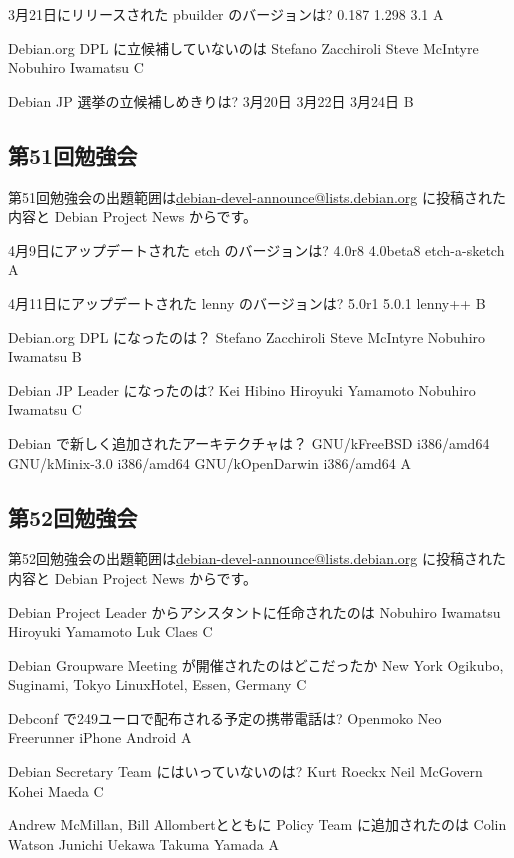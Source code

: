 \documentclass[mingoth,a4paper]{jsarticle}
\begin{document}
\begin{commandline}
 \santaku
 {3月21日にリリースされた pbuilder のバージョンは?}
 {0.187}
 {1.298}
 {3.1}
 {A}

 \santaku
 {Debian.org DPL に立候補していないのは}
 {Stefano Zacchiroli}
 {Steve McIntyre}
 {Nobuhiro Iwamatsu}
 {C}

 \santaku
 {Debian JP 選挙の立候補しめきりは?}
 {3月20日}
 {3月22日}
 {3月24日}
 {B}
 
 \subsection{第51回勉強会}
第51回勉強会の出題範囲は\url{debian-devel-announce@lists.debian.org} に投稿された内容と Debian Project News からです。

 \santaku
 {4月9日にアップデートされた etch のバージョンは?}
 {4.0r8}
 {4.0beta8}
 {etch-a-sketch}
 {A}

 \santaku
 {4月11日にアップデートされた lenny のバージョンは?}
 {5.0r1}
 {5.0.1}
 {lenny++}
 {B}

 \santaku
 {Debian.org DPL になったのは？}
 {Stefano Zacchiroli}
 {Steve McIntyre}
 {Nobuhiro Iwamatsu}
 {B}

 \santaku
 {Debian JP Leader になったのは?}
 {Kei Hibino}
 {Hiroyuki Yamamoto}
 {Nobuhiro Iwamatsu}
 {C}

 \santaku
 {Debian で新しく追加されたアーキテクチャは？}
 {GNU/kFreeBSD i386/amd64}
 {GNU/kMinix-3.0 i386/amd64}
 {GNU/kOpenDarwin i386/amd64}
 {A}

 \subsection{第52回勉強会}
第52回勉強会の出題範囲は\url{debian-devel-announce@lists.debian.org} に投稿された内容と Debian Project News からです。

\santaku
{Debian Project Leader からアシスタントに任命されたのは}
{Nobuhiro Iwamatsu}
{Hiroyuki Yamamoto}
{Luk Claes}
{C}

\santaku
{Debian Groupware Meeting が開催されたのはどこだったか}
{New York}
{Ogikubo, Suginami, Tokyo}
{LinuxHotel, Essen, Germany}
{C}

\santaku
{Debconf で249ユーロで配布される予定の携帯電話は?}
{Openmoko Neo Freerunner}
{iPhone}
{Android}
{A}

\santaku
{Debian Secretary Team にはいっていないのは?}
{Kurt Roeckx}
{Neil McGovern}
{Kohei Maeda}
{C}

\santaku
{Andrew McMillan, Bill Allombertとともに Policy Team に追加されたのは}
{Colin Watson}
{Junichi Uekawa}
{Takuma Yamada}
{A}


\end{commandline}
\end{document}
